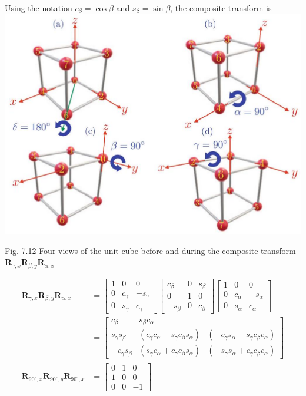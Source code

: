 \documentclass[10pt]{article}
\begin{document}
Using the notation $c_{\beta}=\cos \beta$ and $s_{\beta}=\sin \beta$, the composite transform is
\includegraphics[max width=\textwidth, center]{2023_04_20_41f1ceac5a31dc7d1b59g-133}

Fig. 7.12 Four views of the unit cube before and during the composite transform $\mathbf{R}_{\gamma, x} \mathbf{R}_{\beta, y} \mathbf{R}_{\alpha, x}$

$$
\begin{aligned}
\mathbf{R}_{\gamma, x} \mathbf{R}_{\beta, y} \mathbf{R}_{\alpha, x} & =\left[\begin{array}{ccc}
1 & 0 & 0 \\
0 & c_{\gamma} & -s_{\gamma} \\
0 & s_{\gamma} & c_{\gamma}
\end{array}\right]\left[\begin{array}{ccc}
c_{\beta} & 0 & s_{\beta} \\
0 & 1 & 0 \\
-s_{\beta} & 0 & c_{\beta}
\end{array}\right]\left[\begin{array}{ccc}
1 & 0 & 0 \\
0 & c_{\alpha} & -s_{\alpha} \\
0 & s_{\alpha} & c_{\alpha}
\end{array}\right] \\
& =\left[\begin{array}{ccc}
c_{\beta} & s_{\beta} c_{\alpha} \\
s_{\gamma} s_{\beta} & \left(c_{\gamma} c_{\alpha}-s_{\gamma} c_{\beta} s_{\alpha}\right) & \left(-c_{\gamma} s_{\alpha}-s_{\gamma} c_{\beta} c_{\alpha}\right) \\
-c_{\gamma} s_{\beta} & \left(s_{\gamma} c_{\alpha}+c_{\gamma} c_{\beta} s_{\alpha}\right) & \left(-s_{\gamma} s_{\alpha}+c_{\gamma} c_{\beta} c_{\alpha}\right)
\end{array}\right] \\
\mathbf{R}_{90^{\circ}, x} \mathbf{R}_{90^{\circ}, y} \mathbf{R}_{90^{\circ}, x} & =\left[\begin{array}{ccc}
0 & 1 & 0 \\
1 & 0 & 0 \\
0 & 0 & -1
\end{array}\right]
\end{aligned}
$$
\end{document}
